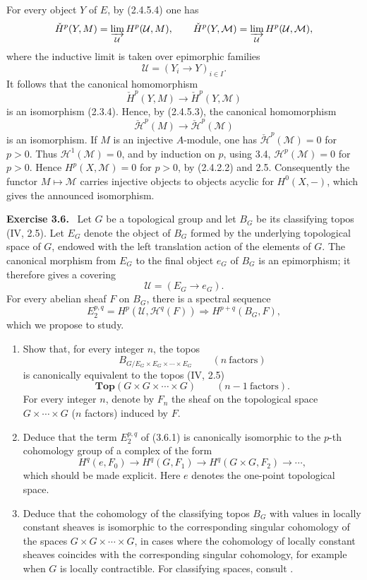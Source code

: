 \documentclass[11pt]{article}
\newcommand{\Hh}{\mathcal{H}}
\newcommand{\Top}{\mathbf{Top}}
\newenvironment{remarktext}[1]{\par\medskip\noindent\textbf{#1.}\ }{\par\medskip}
\begin{document}
For every object $Y$ of $E$, by (2.4.5.4) one has
\[
\check H^p(Y,M)=\varinjlim_{\mathcal U}H^p(\mathcal U,M),
\qquad
\check H^p(Y,\mathcal M)=
\varinjlim_{\mathcal U}H^p(\mathcal U,\mathcal M),
\]
where the inductive limit is taken over epimorphic families
\[
\mathcal U=(Y_i\to Y)_{i\in I}.
\]
It follows that the canonical homomorphism
\[
\check H^p(Y,M)\longrightarrow \check H^p(Y,\mathcal M)
\]
is an isomorphism (2.3.4). Hence, by (2.4.5.3), the canonical homomorphism
\[
\check{\Hh}^p(M)\longrightarrow \check{\Hh}^p(\mathcal M)
\]
is an isomorphism. If $M$ is an injective $A$-module, one has $\check{\Hh}^p(\mathcal M)=0$ for $p>0$. Thus $\Hh^1(\mathcal M)=0$, and by induction on $p$, using 3.4, $\Hh^p(\mathcal M)=0$ for $p>0$. Hence $H^p(X,\mathcal M)=0$ for $p>0$, by (2.4.2.2) and 2.5. Consequently the functor $M\mapsto\mathcal M$ carries injective objects to objects acyclic for $H^0(X,-)$, which gives the announced isomorphism.

\begin{remarktext}{Exercise 3.6}
Let $G$ be a topological group and let $B_G$ be its classifying topos (IV, 2.5). Let $E_G$ denote the object of $B_G$ formed by the underlying topological space of $G$, endowed with the left translation action of the elements of $G$. The canonical morphism from $E_G$ to the final object $e_G$ of $B_G$ is an epimorphism; it therefore gives a covering
\[
\mathcal U=(E_G\to e_G).
\]
For every abelian sheaf $F$ on $B_G$, there is a spectral sequence
\[
E_2^{p,q}=H^p(\mathcal U,\Hh^q(F))
\Longrightarrow H^{p+q}(B_G,F),
\tag{3.6.1}
\]
which we propose to study.
\end{remarktext}

\begin{enumerate}[label=\arabic*)]
\item Show that, for every integer $n$, the topos
\[
B_{G/E_G\times E_G\times\cdots\times E_G}
\qquad (n\ \text{factors})
\]
is canonically equivalent to the topos (IV, 2.5)
\[
\Top(G\times G\times\cdots\times G)
\qquad (n-1\ \text{factors}).
\]
For every integer $n$, denote by $F_n$ the sheaf on the topological space $G\times\cdots\times G$ ($n$ factors) induced by $F$.

\item Deduce that the term $E_2^{p,q}$ of (3.6.1) is canonically isomorphic to the $p$-th cohomology group of a complex of the form
\[
H^q(e,F_0)\longrightarrow H^q(G,F_1)
\longrightarrow H^q(G\times G,F_2)\longrightarrow\cdots,
\]
which should be made explicit. Here $e$ denotes the one-point topological space.

\item Deduce that the cohomology of the classifying topos $B_G$ with values in locally constant sheaves is isomorphic to the corresponding singular cohomology of the spaces $G\times G\times\cdots\times G$, in cases where the cohomology of locally constant sheaves coincides with the corresponding singular cohomology, for example when $G$ is locally contractible. For classifying spaces, consult \cite{15}.
\end{enumerate}
\end{document}
